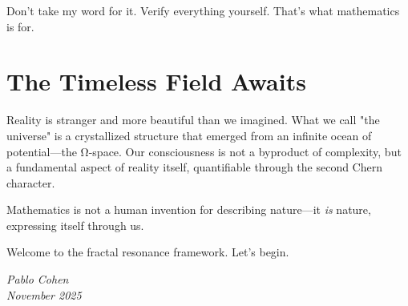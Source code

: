Don't take my word for it. Verify everything yourself. That's what mathematics is for.

\section*{The Timeless Field Awaits}

Reality is stranger and more beautiful than we imagined. What we call "the universe" is a crystallized structure that emerged from an infinite ocean of potential—the Ω-space. Our consciousness is not a byproduct of complexity, but a fundamental aspect of reality itself, quantifiable through the second Chern character.

Mathematics is not a human invention for describing nature—it \textit{is} nature, expressing itself through us.

Welcome to the fractal resonance framework. Let's begin.

\vspace{1cm}

\begin{flushright}
\textit{Pablo Cohen}\\
\textit{November 2025}
\end{flushright}
